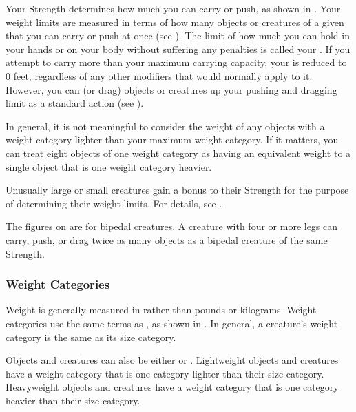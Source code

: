     Your Strength determines how much you can carry or push, as shown in .
    Your weight limits are measured in terms of how many objects or creatures of a given  that you can carry or push at once (see ).
    The limit of how much you can hold in your hands or on your body without suffering any penalties is called your .
    If you attempt to carry more than your maximum carrying capacity, your  is reduced to 0 feet, regardless of any other modifiers that would normally apply to it.
    However, you can  (or drag) objects or creatures up your pushing and dragging limit as a standard action (see ).

    In general, it is not meaningful to consider the weight of any objects with a weight category lighter than your maximum weight category.
    If it matters, you can treat eight objects of one weight category as having an equivalent weight to a single object that is one weight category heavier.

     Unusually large or small creatures gain a bonus to their Strength for the purpose of determining their weight limits.
    For details, see .

     The figures on  are for bipedal creatures.
    A creature with four or more legs can carry, push, or drag twice as many objects as a bipedal creature of the same Strength.

    \subsubsection{Weight Categories}\label{Weight Categories}
      Weight is generally measured in  rather than pounds or kilograms.
      Weight categories use the same terms as , as shown in .
      In general, a creature's weight category is the same as its size category.

      Objects and creatures can also be either  or .
      Lightweight objects and creatures have a weight category that is one category lighter than their size category.
      Heavyweight objects and creatures have a weight category that is one category heavier than their size category.

